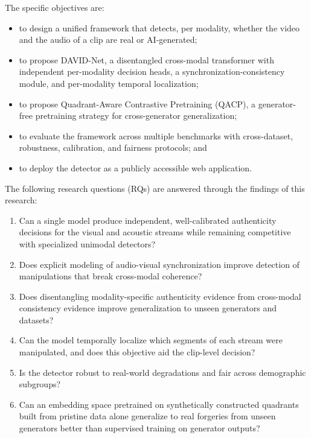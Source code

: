 The specific objectives are:
\begin{itemize}
  \item to design a unified framework that detects, per modality, whether the
        video and the audio of a clip are real or AI-generated;
  \item to propose DAVID-Net, a disentangled cross-modal transformer with
        independent per-modality decision heads, a synchronization-consistency
        module, and per-modality temporal localization;
  \item to propose Quadrant-Aware Contrastive Pretraining (QACP), a
        generator-free pretraining strategy for cross-generator generalization;
  \item to evaluate the framework across multiple benchmarks with
        cross-dataset, robustness, calibration, and fairness protocols; and
  \item to deploy the detector as a publicly accessible web application.
\end{itemize}

The following research questions (RQs) are answered through the findings of
this research:
\begin{enumerate}[label=\textbf{RQ\arabic*.}]
  \item Can a single model produce independent, well-calibrated authenticity
        decisions for the visual and acoustic streams while remaining
        competitive with specialized unimodal detectors?
  \item Does explicit modeling of audio-visual synchronization improve
        detection of manipulations that break cross-modal coherence?
  \item Does disentangling modality-specific authenticity evidence from
        cross-modal consistency evidence improve generalization to unseen
        generators and datasets?
  \item Can the model temporally localize which segments of each stream were
        manipulated, and does this objective aid the clip-level decision?
  \item Is the detector robust to real-world degradations and fair across
        demographic subgroups?
  \item Can an embedding space pretrained on synthetically constructed
        quadrants built from pristine data alone generalize to real forgeries
        from unseen generators better than supervised training on generator
        outputs?
\end{enumerate}

